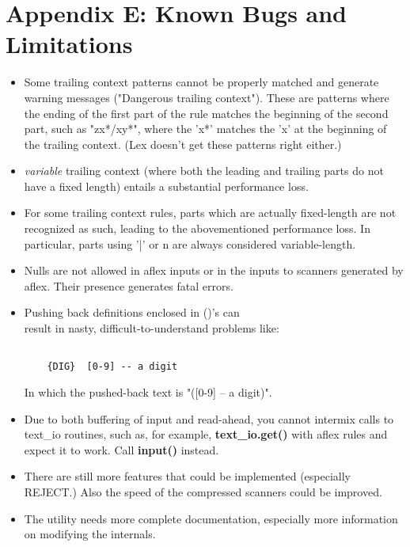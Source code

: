 \newpage
\section{Appendix E: Known Bugs and Limitations}
\begin{itemize}

\item Some trailing context
patterns cannot be properly matched and generate
warning messages ("Dangerous trailing context").  These are
patterns where the ending of the
first part of the rule matches the beginning of the second
part, such as "zx*/xy*", where the 'x*' matches the 'x' at
the beginning of the trailing context.  (Lex doesn't get these
patterns right either.)

\item {\it variable}
trailing context (where both the leading and trailing parts do not have
a fixed length) entails a substantial performance loss.

\item For some trailing context rules, parts which are actually
fixed-length are not recognized as such, leading to the abovementioned
performance loss.  In particular, parts using '|' or {n} are always
considered variable-length.

\item Nulls are not allowed in aflex inputs or in the inputs to
scanners generated by aflex.  Their presence generates fatal
errors.

\item Pushing back definitions enclosed in ()'s can \\result in nasty,
difficult-to-understand problems like:
\begin{verbatim}

	{DIG}  [0-9] -- a digit

\end{verbatim}
In which the pushed-back text is "([0-9] -- a digit)".

\item Due to both buffering of input and read-ahead, you cannot intermix
calls to text\_io routines, such as, for example,
{\bf text\_io.get()}
with aflex rules and expect it to work.  Call
{\bf input()}
instead.

\item There are still more features that could be 
implemented (especially REJECT.)  Also the speed of the compressed
scanners could be improved. 

\item The utility needs more complete documentation, especially more
information on modifying the internals.
\end{itemize}

\newpage



